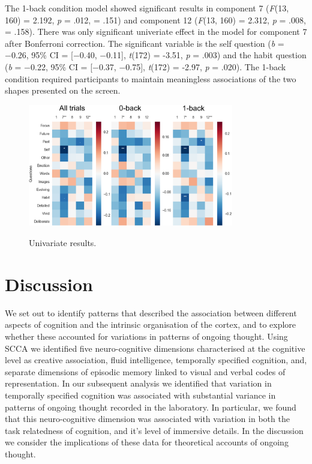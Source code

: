 The 1-back condition model showed significant results in
component 7
(\textit{F}(13, 160) = 2.192, \textit{p} = .012, \paretasquared = .151)
and component 12
(\textit{F}(13, 160) = 2.312, \textit{p} = .008, \paretasquared = .158). There was only significant univeriate effect in the model for component 7 after Bonferroni correction.
The significant variable is the self question
(\textit{b} = −0.26, 95\% CI = [−0.40, −0.11], \textit{t}(172) = -3.51, \textit{p} = .003)
and the habit question
(\textit{b} = −0.22, 95\% CI = [−0.37, −0.75], \textit{t}(172) = -2.97, \textit{p} = .020).
The 1-back condition required participants to maintain meaningless associations of the two shapes presented on the screen.

\begin{figure}[H]
	\centering
	\includegraphics[width=0.8\textwidth]{study3/image/study3fig4.png}
	\caption{Univariate results.}
	\caption*{
	\footnotesize{
	}
	}
	\label{fig:study3:fig4}
\end{figure}


\section{Discussion}
\label{study3:discussion}

We set out to identify patterns that described the association between different aspects of cognition and the intrinsic organisation of the cortex, and to explore whether these accounted for variations in patterns of ongoing thought. Using SCCA we identified five neuro-cognitive dimensions characterised at the cognitive level as creative association, fluid intelligence, temporally specified cognition, and, separate dimensions of episodic memory linked to visual and verbal codes of representation. In our subsequent analysis we identified that variation in temporally specified cognition was associated with substantial variance in patterns of ongoing thought recorded in the laboratory. In particular, we found that this neuro-cognitive dimension was associated with variation in both the task relatedness of cognition, and it’s level of immersive details. In the discussion we consider the implications of these data for theoretical accounts of ongoing thought.

